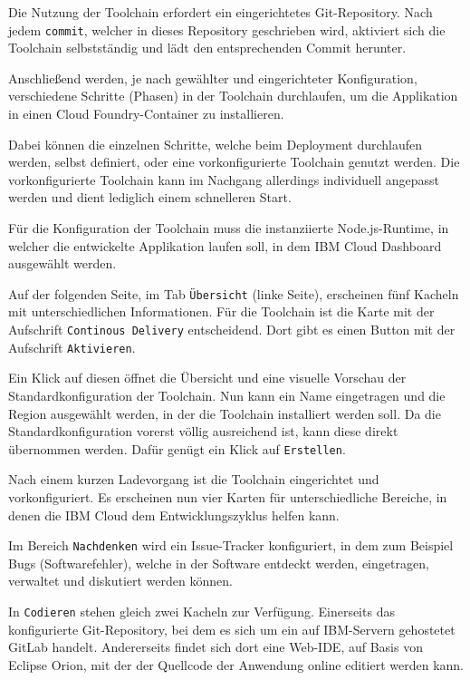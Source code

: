 Die Nutzung der Toolchain erfordert ein eingerichtetes Git-Repository. Nach jedem \texttt{commit}, welcher in dieses
Repository geschrieben wird, aktiviert sich die Toolchain selbstständig und lädt den entsprechenden Commit herunter.

Anschließend werden, je nach gewählter und eingerichteter Konfiguration, verschiedene Schritte (Phasen) in der Toolchain
durchlaufen, um die Applikation in einen Cloud Foundry-Container zu installieren.

Dabei können die einzelnen Schritte, welche beim Deployment durchlaufen werden, selbst definiert, oder eine
vorkonfigurierte Toolchain genutzt werden. Die vorkonfigurierte Toolchain kann im Nachgang allerdings individuell
angepasst werden und dient lediglich einem schnelleren Start.

Für die Konfiguration der Toolchain muss die instanziierte Node.js-Runtime, in welcher die entwickelte Applikation laufen
soll, in dem IBM Cloud Dashboard ausgewählt werden.

Auf der folgenden Seite, im Tab \texttt{Übersicht} (linke Seite), erscheinen fünf Kacheln mit unterschiedlichen Informationen.
Für die Toolchain ist die Karte mit der Aufschrift \texttt{Continous Delivery} entscheidend. Dort gibt es einen Button
mit der Aufschrift \texttt{Aktivieren}.

Ein Klick auf diesen öffnet die Übersicht und eine visuelle Vorschau der Standardkonfiguration der Toolchain. Nun kann
ein Name eingetragen und die Region ausgewählt werden, in der die Toolchain installiert werden soll. Da die
Standardkonfiguration vorerst völlig ausreichend ist, kann diese direkt übernommen werden. Dafür genügt ein Klick auf
\texttt{Erstellen}.

Nach einem kurzen Ladevorgang ist die Toolchain eingerichtet und vorkonfiguriert. Es erscheinen nun vier Karten für
unterschiedliche Bereiche, in denen die IBM Cloud dem Entwicklungszyklus helfen kann.

Im Bereich \texttt{Nachdenken} wird ein Issue-Tracker konfiguriert, in dem zum Beispiel Bugs (Softwarefehler), welche
in der Software entdeckt werden, eingetragen, verwaltet und diskutiert werden können.

In \texttt{Codieren} stehen gleich zwei Kacheln zur Verfügung. Einerseits das konfigurierte Git-Repository, bei dem es
sich um ein auf IBM-Servern gehostetet GitLab handelt. Andererseits findet sich dort eine Web-IDE, auf Basis von Eclipse
Orion, mit der der Quellcode der Anwendung online editiert werden kann.

